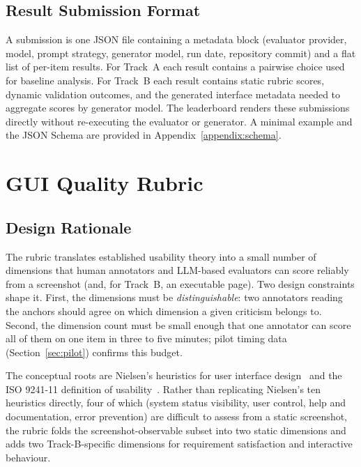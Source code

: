 \subsection{Result Submission Format}

A submission is one JSON file containing a metadata block (evaluator
provider, model, prompt strategy, generator model, run date, repository
commit) and a flat list of per-item results. For Track~A each result
contains a pairwise choice used for baseline analysis. For Track~B each
result contains static rubric scores, dynamic validation outcomes, and
the generated interface metadata needed to aggregate scores by
generator model. The leaderboard renders these submissions directly
without re-executing the evaluator or generator. A minimal example and the
JSON Schema are provided in Appendix~\ref{appendix:schema}.

\section{GUI Quality Rubric}
\label{sec:rubric}

\subsection{Design Rationale}

The rubric translates established usability theory into a small number
of dimensions that human annotators and LLM-based evaluators can score
reliably from a screenshot (and, for Track~B, an executable page).
Two design constraints shape it. First, the dimensions must be
\emph{distinguishable}: two annotators reading the anchors should agree
on which dimension a given criticism belongs to. Second, the dimension
count must be small enough that one annotator can score all of them on
one item in three to five minutes; pilot timing data
(Section~\ref{sec:pilot}) confirms this budget.

The conceptual roots are Nielsen's heuristics for user interface
design~\cite{nielsen1990heuristic, nielsen1994usability} and the ISO
9241-11 definition of usability~\cite{iso9241-11}. Rather than
replicating Nielsen's ten heuristics directly, four of which (system
status visibility, user control, help and documentation, error
prevention) are difficult to assess from a static screenshot, the
rubric folds the screenshot-observable subset into two static
dimensions and adds two Track-B-specific dimensions for
requirement satisfaction and interactive behaviour.

